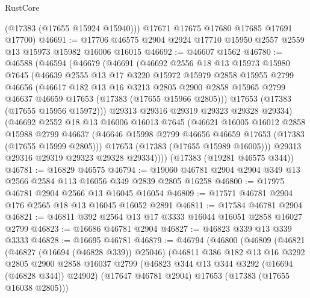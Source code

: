 \begin{lexlean}{RustCore}
\begin{coremodule}
        (@17383 (@17655 @15924 @15940)))
      @17671
      @17675
      @17680
      @17685
      @17691
      @17700)
@46691 := @17706 @46575 @2904 @2924 @17710 @15950 @2557 @2559 @13 @15973 @15982 @16006 @16015
@46692 := @46607 @1562
@46780 := @46588
    (@46594
      (@46679
        (@46691
          (@46692
            @2556
            @18
            @13
            @15973
            @15980
            @7645
            (@46639
              @2555
              @13
              @17
              @3220
              @15972
              @15979
              @2858
              @15955
              @2799
              @46656
              (@46617
                @182
                @13
                @16
                @3213
                @2805
                @2900
                @2858
                @15965
                @2799
                @46637
                @46659
                @17653
                (@17383 (@17655 @15966 @2805)))
              @17653
              (@17383 (@17655 @15956 @15972)))
            @29313
            @29316
            @29319
            @29323
            @29328
            @29334)
          (@46692
            @2552
            @18
            @13
            @16006
            @16013
            @7645
            (@46621
              @16005
              @16012
              @2858
              @15988
              @2799
              @46637
              (@46646 @15998 @2799 @46656 @46659 @17653 (@17383 (@17655 @15999 @2805)))
              @17653
              (@17383 (@17655 @15989 @16005)))
            @29313
            @29316
            @29319
            @29323
            @29328
            @29334))))
    (@17383 (@19281 @46575 @344))
@46781 := @16829 @46575
@46794 := @19060 @46781 @2904 @2904 @349 @13 @2566 @2584 @113 @16056 @349 @2839 @2805 @16258
@46800 := @17975 @46781 @2904 @2566 @13 @16045 @16054
@46809 := @17571 @46781 @2904 @176 @2565 @18 @13 @16045 @16052 @2891
@46811 := @17584 @46781 @2904
@46821 := @46811 @392 @2564 @13 @17 @3333 @16044 @16051 @2858 @16027 @2799
@46823 := @16686 @46781 @2904
@46827 := @46823 @339 @13 @339 @3333
@46828 := @16695 @46781
@46879 := @46794
    (@46800
      (@46809
        (@46821
          (@46827 (@16694 (@46828 @339)) @25046)
          (@46811
            @386
            @182
            @13
            @16
            @3292
            @2805
            @2900
            @2858
            @16037
            @2799
            (@46823 @344 @13 @344 @3292 (@16694 (@46828 @344)) @24902)
            (@17647 @46781 @2904)
            @17653
            (@17383 (@17655 @16038 @2805)))

\end{coremodule}
\end{lexlean}
